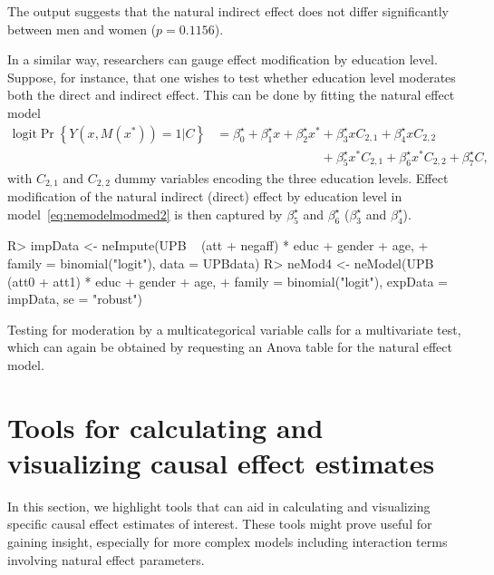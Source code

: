 \documentclass[nojss]{jss}
\newcounter{dummy}
\begin{document}
\par The output suggests that the natural indirect effect does not differ significantly between men and women ($p = 0.1156$).
\par In a similar way, researchers can gauge effect modification by education level. Suppose, for instance, that one wishes to test whether education level moderates both the direct and indirect effect. This can be done by fitting the natural effect model
\begin{align}\label{eq:nemodelmodmed2}
\mbox{logit} \Pr\left\{Y(x,M(x^*))=1|C\right\} &= \beta_0^{\star} + \beta_1^{\star} x + \beta_2^{\star} x^* + \beta_3^{\star} x C_{2,1} + \beta_4^{\star} x C_{2,2}\nonumber\\ & \phantom{= \beta_0^{\star} + \beta_1^{\star} x + \beta_2^{\star} x^*} + \beta_5^{\star} x^* C_{2,1} + \beta_6^{\star} x^* C_{2,2} + \beta_7^{\star} C,
\end{align}
with $C_{2,1}$ and $C_{2,2}$ dummy variables encoding the three education levels. Effect modification of the natural indirect (direct) effect by education level in model~\eqref{eq:nemodelmodmed2} is then captured by $\beta_5^{\star}$ and $\beta_6^{\star}$ ($\beta_3^{\star}$ and $\beta_4^{\star}$).
\begin{Schunk}
\begin{Sinput}
R> impData <- neImpute(UPB ~ (att + negaff) * educ + gender + age,
+    family = binomial("logit"), data = UPBdata)
R> neMod4 <- neModel(UPB ~ (att0 + att1) * educ + gender + age,
+    family = binomial("logit"), expData = impData, se = "robust")
\end{Sinput}
\end{Schunk}
Testing for moderation by a multicategorical variable calls for a multivariate test, which can again be obtained by requesting an Anova table for the natural effect model.

\newpage
\section{Tools for calculating and visualizing causal effect estimates}\label{tools}
In this section, we highlight tools that can aid in calculating and visualizing specific causal effect estimates of interest. These tools might prove useful for gaining insight, especially for more complex models including interaction terms involving natural effect parameters. 
\end{document}
